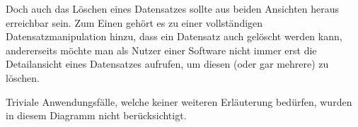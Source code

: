 Doch auch das Löschen eines Datensatzes sollte aus beiden Ansichten heraus erreichbar sein. Zum Einen gehört es
zu einer vollständigen Datensatzmanipulation hinzu, dass ein Datensatz auch gelöscht werden kann, andererseits möchte
man als Nutzer einer Software nicht immer erst die Detailansicht eines Datensatzes aufrufen, um diesen (oder gar mehrere)
zu löschen.

Triviale Anwendungsfälle, welche keiner weiteren Erläuterung bedürfen, wurden in diesem Diagramm nicht berücksichtigt.